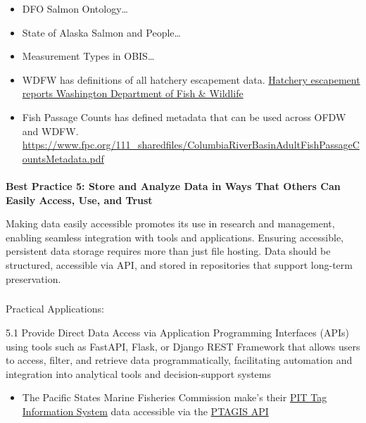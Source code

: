 \documentclass[
  letterpaper,
  DIV=11,
  numbers=noendperiod]{scrartcl}
\makeatletter
\let\oldparagraph\paragraph
\renewcommand{\paragraph}{
    \@ifstar
      \xxxParagraphStar
      \xxxParagraphNoStar
  }
\newcommand{\xxxParagraphStar}[1]{\oldparagraph*{#1}\mbox{}}
\newcommand{\xxxParagraphNoStar}[1]{\oldparagraph{#1}\mbox{}}
\let\oldsubparagraph\subparagraph
\renewcommand{\subparagraph}{
    \@ifstar
      \xxxSubParagraphStar
      \xxxSubParagraphNoStar
  }
\newcommand{\xxxSubParagraphStar}[1]{\oldsubparagraph*{#1}\mbox{}}
\newcommand{\xxxSubParagraphNoStar}[1]{\oldsubparagraph{#1}\mbox{}}
\providecommand{\tightlist}{%
  \setlength{\itemsep}{0pt}\setlength{\parskip}{0pt}}\usepackage{longtable,booktabs,array}
\makeatother
\begin{document}
\begin{itemize}
\item
  DFO Salmon Ontology\ldots{}
\item
  State of Alaska Salmon and People\ldots{}
\item
  Measurement Types in OBIS\ldots{}
\item
  WDFW has definitions of all hatchery escapement data.
  \href{https://wdfw.wa.gov/fishing/management/hatcheries/escapement\#definitions}{Hatchery
  escapement reports \textbar{} Washington Department of Fish \&
  Wildlife}
\item
  Fish Passage Counts has defined metadata that can be used across OFDW
  and WDFW.
  \url{https://www.fpc.org/111_sharedfiles/ColumbiaRiverBasinAdultFishPassageCountsMetadata.pdf}
\end{itemize}

\paragraph{\texorpdfstring{\textbf{Best Practice 5: Store and Analyze
Data in Ways That Others Can Easily Access, Use, and
Trust}}{Best Practice 5: Store and Analyze Data in Ways That Others Can Easily Access, Use, and Trust}}\label{best-practice-5-store-and-analyze-data-in-ways-that-others-can-easily-access-use-and-trust}

Making data easily accessible promotes its use in research and
management, enabling seamless integration with tools and applications.
Ensuring accessible, persistent data storage requires more than just
file hosting. Data should be structured, accessible via API, and stored
in repositories that support long-term preservation.

\subparagraph{Practical Applications:}\label{practical-applications-4}

5.1 Provide Direct Data Access via Application Programming Interfaces
(APIs) using tools such as FastAPI, Flask, or Django REST Framework that
allows users to access, filter, and retrieve data programmatically,
facilitating automation and integration into analytical tools and
decision-support systems

\begin{itemize}
\tightlist
\item
  The Pacific States Marine Fisheries Commission make's their
  \href{https://www.psmfc.org/program/pit-tag-information-systems-ptagis}{PIT
  Tag Information System} data accessible via the
  \href{https://api.ptagis.org/index.html\#:~:text=PTAGIS\%20API\%20Gets\%20a\%20list,PTAGIS\%20and\%20currently\%20contributing\%20data}{PTAGIS
  API}
\end{itemize}
\end{document}
